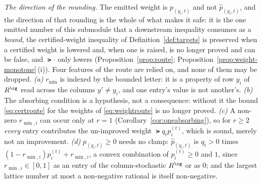 \begin{definition}
\emph{The direction of the rounding.} The emitted weight is $p_{(y_i,t)}$ and
not $\hat p_{(y_i,t)}$, and the direction of that rounding is the whole of
what makes it safe: it is the one emitted number of this submodule that a
downstream inequality consumes as a \emph{bound}, the certified-weight
inequality of Definition~\ref{def:targets} is preserved when a certified
weight is lowered and, when one is raised, is no longer proved and can be
false, and $\lat{\cdot}$ only lowers (Proposition~\ref{prop:route};
Proposition~\ref{prop:weight-monotone}\,(i)). Four features of the route are relied on, and none of them may
be dropped.
\emph{(a)} $r_{\min}$ is indexed by the bounded letter: it is a property of row
$y_i$ of $R^{\cg}$ read across the columns $y'\ne y_i$, and one entry's value is
not another's.
\emph{(b)} The absorbing condition is a hypothesis, not a consequence:
without it the bound \eqref{eq:certroute} for the weights of
\eqref{eq:weightroute} is no longer proved.
\emph{(c)} A non-zero $r_{\min,i}$ can occur only at $r=1$
(Corollary~\ref{cor:oneabsorbing}), so for $r\ge2$ \emph{every} entry
contributes the un-improved weight $\lat{q_tp^{(t)}_i}$, which is sound,
merely not an improvement.
\emph{(d)} $p_{(y_i,t)}\ge0$ needs no clamp: $\hat p_{(y_i,t)}$ is $q_t>0$
times $(1-r_{\min,i})p^{(t)}_i+r_{\min,i}$, a convex combination of
$p^{(t)}_i\ge0$ and $1$, since $r_{\min,i}\in[0,1]$ as an entry of the
column-stochastic $R^{\cg}$ or as $0$; and the largest lattice number at most
a non-negative rational is itself non-negative.
\end{definition}
